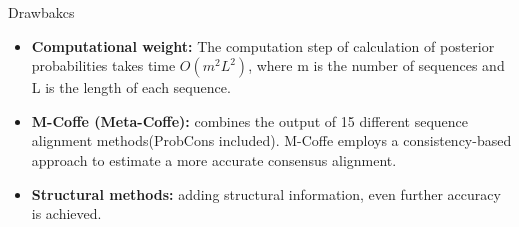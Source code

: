 \begin{frame}{Drawbakcs}
    \begin{itemize}
        \item \textbf{Computational weight:} The computation step of calculation of posterior probabilities  takes time $O(m^2L^2)$, where m is the number of sequences and L is the length of each sequence.
        \item \textbf{M-Coffe (Meta-Coffe):} combines the output of 15 different sequence alignment methods(ProbCons included). M-Coffe employs a consistency-based approach to estimate a more accurate consensus alignment. 
        \item \textbf{Structural methods:} adding structural information, even further accuracy is achieved. 
    \end{itemize}
    
\end{frame}